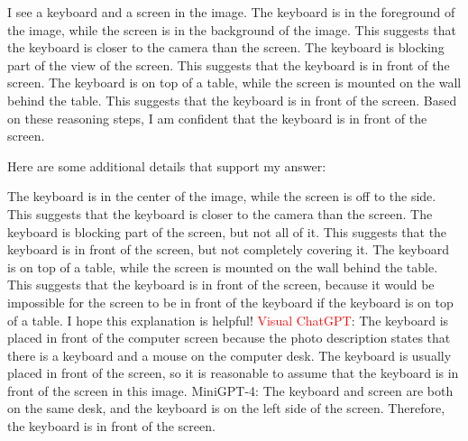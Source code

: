 \begin{enumerate}
    I see a keyboard and a screen in the image.
    The keyboard is in the foreground of the image, while the screen is in the background of the image. This suggests that the keyboard is closer to the camera than the screen.
    The keyboard is blocking part of the view of the screen. This suggests that the keyboard is in front of the screen.
    The keyboard is on top of a table, while the screen is mounted on the wall behind the table. This suggests that the keyboard is in front of the screen.
    Based on these reasoning steps, I am confident that the keyboard is in front of the screen.
    
    Here are some additional details that support my answer:
    
    The keyboard is in the center of the image, while the screen is off to the side. This suggests that the keyboard is closer to the camera than the screen.
    The keyboard is blocking part of the screen, but not all of it. This suggests that the keyboard is in front of the screen, but not completely covering it.
    The keyboard is on top of a table, while the screen is mounted on the wall behind the table. This suggests that the keyboard is in front of the screen, because it would be impossible for the screen to be in front of the keyboard if the keyboard is on top of a table.
    I hope this explanation is helpful!
    \subitem \textcolor{red}{Visual ChatGPT}: The keyboard is placed in front of the computer screen because the photo description states that there is a keyboard and a mouse on the computer desk. The keyboard is usually placed in front of the screen, so it is reasonable to assume that the keyboard is in front of the screen in this image.
    \subitem MiniGPT-4: The keyboard and screen are both on the same desk, and the keyboard is on the left side of the screen. Therefore, the keyboard is in front of the screen.
\end{enumerate}
